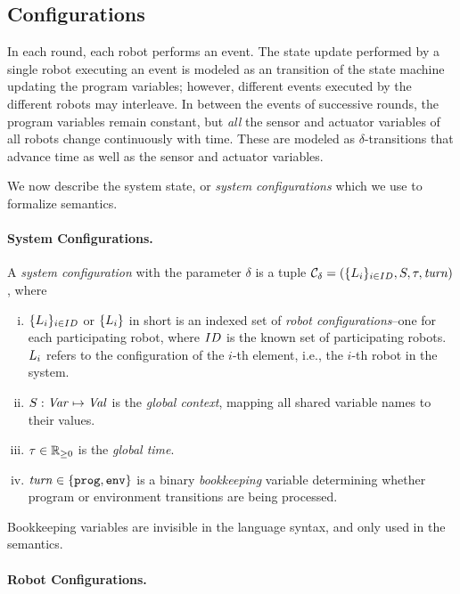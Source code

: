 \subsection{Configurations}\label{sec:configs}

In each round, each robot performs an event.
The state update performed by a single robot executing an event is modeled as an transition of the state machine updating the program variables;
however, different events executed by the different robots may interleave.
In between the events of successive rounds, the program variables remain constant,
but {\em all\/} the sensor and actuator variables of all robots change continuously with time.
These are modeled as $\delta$-transitions that advance time as well as the sensor and actuator variables.

We now describe the system state, or \emph{system configurations} which we use to formalize \lgname semantics.

\paragraph{System Configurations.}

A {\em system configuration\/} with the parameter $\delta$ is a tuple
$\mathcal{C}_\delta = (\{L_{i}\}_{i\in ID},{S},\tau,\mathit{turn})$, where

\begin{enumerate}[i)]
\item $\{L_{i}\}_{i\in ID}$ or $\{L_{i}\}$ in short is an indexed set of \emph{robot configurations}--one for each participating robot,
      where $ID$ is the known set of participating robots.
      $L_{i}$ refers to the configuration of the $i$-th element, i.e., the $i$-th robot in the system.
\item ${S} : \mathit{Var} \mapsto \mathit{Val}$ is the {\em global context\/}, mapping all shared variable names to their values.
\item $\tau\in \nnreals$ is the {\em global time\/}.
\item $\mathit{turn}\in\{\mathtt{prog,env}\}$ is a binary \emph{bookkeeping} variable determining whether  program or environment transitions are being processed.
\end{enumerate}

Bookkeeping variables are invisible in the language syntax, and only used in the semantics.


\paragraph{Robot Configurations.}

